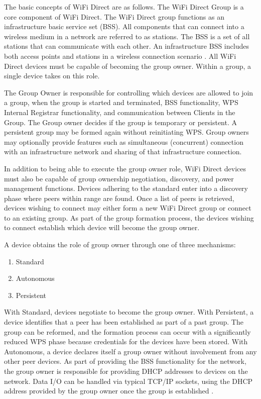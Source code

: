 \documentclass[10pt,twocolumn]{article}
\begin{document}
The basic concepts of WiFi Direct are as follows. 
The WiFi Direct Group is a core component of WiFi Direct. 
The WiFi Direct group functions as an infrastructure basic service set (BSS). 
All components that can connect into a wireless medium in a network are referred to as stations. 
The BSS is a set of all stations that can communicate with each other. 
An infrastructure BSS includes both access points and stations in a wireless connection scenario \cite{wirelesslanwiki}.
All WiFi Direct devices must be capable of becoming the group owner. 
Within a group, a single device takes on this role.
 
The Group Owner is responsible for controlling which devices are allowed to join a group, when the group is started and terminated, BSS functionality, WPS Internal Registrar functionality, and communication between Clients in the Group. 
The Group owner decides if the group is temporary or persistent. 
A persistent group may be formed again without reinitiating WPS.
Group owners may optionally provide features such as simultaneous (concurrent) connection with an infrastructure network and sharing of that infrastructure connection. 

In addition to being able to execute the group owner role, WiFi Direct devices must also be capable of group ownership negotiation, discovery, and power management functions.
Devices adhering to the standard enter into a discovery phase where peers within range are found. 
Once a list of peers is retrieved, devices wishing to connect may either form a new  WiFi Direct group or connect to an existing group. 
As part of the group formation process, the devices wishing to connect establish which device will become the group owner.

A device obtains the role of group owner through one of three mechanisms: 
\begin{enumerate}
\item Standard
\item Autonomous
\item Persistent
\end{enumerate} 
With Standard, devices negotiate to become the group owner.
With Persistent, a device identifies that a peer has been established as part of a past group. 
The group can be reformed, and the formation process can occur with a significantly reduced WPS phase because credentials for the devices have been stored.
With Autonomous, a device declares itself a group owner without involvement from any other peer devices. 
As part of providing the BSS functionality for the network, the group owner is responsible for providing DHCP addresses to devices on the network.
Data I/O can be handled via typical TCP/IP sockets, using the DHCP address provided by the group owner once the group is established \cite{wifiwhitepaper}.
\end{document}

